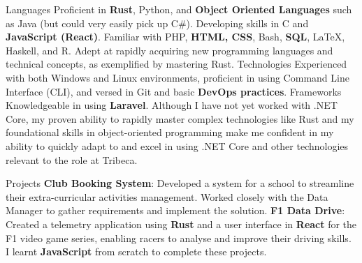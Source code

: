 
\begin{cvskills}
  \cvskill
    {Languages} %
    {Proficient in \textbf{Rust}, Python, and \textbf{Object Oriented Languages} such as Java (but could very easily pick up C\#). Developing skills in C and \textbf{JavaScript (React)}. Familiar with PHP, \textbf{HTML, CSS}, Bash, \textbf{SQL}, LaTeX, Haskell, and R.} %
  \cvskill
    {}
    {Adept at rapidly acquiring new programming languages and technical concepts, as exemplified by mastering Rust.}
  \cvskill
    {Technologies}
    {Experienced with both Windows and Linux environments, proficient in using Command Line Interface (CLI), and versed in Git and basic \textbf{DevOps practices}.}
    \cvskill
  {Frameworks}
  {Knowledgeable in using \textbf{Laravel}. Although I have not yet worked with .NET Core, my proven ability to rapidly master complex technologies like Rust and my foundational skills in object-oriented programming make me confident in my ability to quickly adapt to and excel in using .NET Core and other technologies relevant to the role at Tribeca.}

  \cvskill
    {Projects}
    {\textbf{Club Booking System}: Developed a system for a school to streamline their extra-curricular activities management. Worked closely with the Data Manager to gather requirements and implement the solution. \textbf{F1 Data Drive}: Created a telemetry application using \textbf{Rust} and a user interface in \textbf{React} for the F1 video game series, enabling racers to analyse and improve their driving skills. I learnt \textbf{JavaScript} from scratch to complete these projects.}
\end{cvskills}
